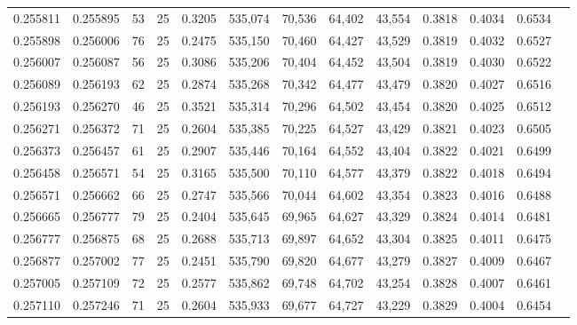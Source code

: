 \begin{tabular}{rrrrrrrrrrrrr}
0.255811 & 0.255895 &    53 &  25 &                                     0.3205 & 535,074 &  70,536 &  64,402 &  43,554 & 0.3818 & 0.4034 & 0.6534 \\
0.255898 & 0.256006 &    76 &  25 &                                     0.2475 & 535,150 &  70,460 &  64,427 &  43,529 & 0.3819 & 0.4032 & 0.6527 \\
0.256007 & 0.256087 &    56 &  25 &                                     0.3086 & 535,206 &  70,404 &  64,452 &  43,504 & 0.3819 & 0.4030 & 0.6522 \\
0.256089 & 0.256193 &    62 &  25 &                                     0.2874 & 535,268 &  70,342 &  64,477 &  43,479 & 0.3820 & 0.4027 & 0.6516 \\
0.256193 & 0.256270 &    46 &  25 &                                     0.3521 & 535,314 &  70,296 &  64,502 &  43,454 & 0.3820 & 0.4025 & 0.6512 \\
0.256271 & 0.256372 &    71 &  25 &                                     0.2604 & 535,385 &  70,225 &  64,527 &  43,429 & 0.3821 & 0.4023 & 0.6505 \\
0.256373 & 0.256457 &    61 &  25 &                                     0.2907 & 535,446 &  70,164 &  64,552 &  43,404 & 0.3822 & 0.4021 & 0.6499 \\
0.256458 & 0.256571 &    54 &  25 &                                     0.3165 & 535,500 &  70,110 &  64,577 &  43,379 & 0.3822 & 0.4018 & 0.6494 \\
0.256571 & 0.256662 &    66 &  25 &                                     0.2747 & 535,566 &  70,044 &  64,602 &  43,354 & 0.3823 & 0.4016 & 0.6488 \\
0.256665 & 0.256777 &    79 &  25 &                                     0.2404 & 535,645 &  69,965 &  64,627 &  43,329 & 0.3824 & 0.4014 & 0.6481 \\
0.256777 & 0.256875 &    68 &  25 &                                     0.2688 & 535,713 &  69,897 &  64,652 &  43,304 & 0.3825 & 0.4011 & 0.6475 \\
0.256877 & 0.257002 &    77 &  25 &                                     0.2451 & 535,790 &  69,820 &  64,677 &  43,279 & 0.3827 & 0.4009 & 0.6467 \\
0.257005 & 0.257109 &    72 &  25 &                                     0.2577 & 535,862 &  69,748 &  64,702 &  43,254 & 0.3828 & 0.4007 & 0.6461 \\
0.257110 & 0.257246 &    71 &  25 &                                     0.2604 & 535,933 &  69,677 &  64,727 &  43,229 & 0.3829 & 0.4004 & 0.6454 \\

\end{tabular}
